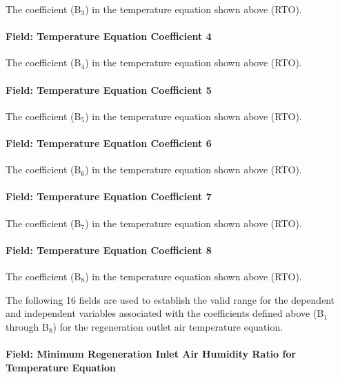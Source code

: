 The coefficient (B\(_{3}\)) in the temperature equation shown above (RTO).

\paragraph{Field: Temperature Equation Coefficient 4}\label{field-temperature-equation-coefficient-4}

The coefficient (B\(_{4}\)) in the temperature equation shown above (RTO).

\paragraph{Field: Temperature Equation Coefficient 5}\label{field-temperature-equation-coefficient-5}

The coefficient (B\(_{5}\)) in the temperature equation shown above (RTO).

\paragraph{Field: Temperature Equation Coefficient 6}\label{field-temperature-equation-coefficient-6}

The coefficient (B\(_{6}\)) in the temperature equation shown above (RTO).

\paragraph{Field: Temperature Equation Coefficient 7}\label{field-temperature-equation-coefficient-7}

The coefficient (B\(_{7}\)) in the temperature equation shown above (RTO).

\paragraph{Field: Temperature Equation Coefficient 8}\label{field-temperature-equation-coefficient-8}

The coefficient (B\(_{8}\)) in the temperature equation shown above (RTO).

The following 16 fields are used to establish the valid range for the dependent and independent variables associated with the coefficients defined above (B\(_{1}\) through B\(_{8}\)) for the regeneration outlet air temperature equation.

\paragraph{Field: Minimum Regeneration Inlet Air Humidity Ratio for Temperature Equation}\label{field-minimum-regeneration-inlet-air-humidity-ratio-for-temperature-equation}

